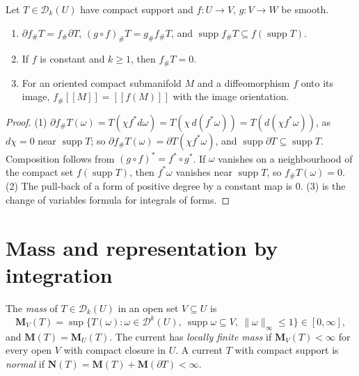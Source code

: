 \begin{proposition}\label{currents:proposition-push-forward}
Let $T \in \mathcal{D}_k(U)$ have compact support and $f \colon U \to V$, $g \colon V \to W$ be smooth.
\begin{enumerate}
\item $\partial f_\#T = f_\#\partial T$, $(g \circ f)_\#T = g_\#f_\#T$, and $\operatorname{supp}f_\#T \subseteq f(\operatorname{supp}T)$.
\item If $f$ is constant and $k \geq 1$, then $f_\#T = 0$.
\item For an oriented compact submanifold $M$ and a diffeomorphism $f$ onto its image, $f_\#[\![M]\!] = [\![f(M)]\!]$ with the image orientation.
\end{enumerate}
\end{proposition}

\begin{proof}
(1) $\partial f_\#T(\omega) = T(\chi f^*d\omega) = T(\chi\,d(f^*\omega)) = T(d(\chi f^*\omega))$, as $d\chi = 0$ near $\operatorname{supp}T$; so $\partial f_\#T(\omega) = \partial T(\chi f^*\omega)$, and
$\operatorname{supp}\partial T \subseteq \operatorname{supp}T$. Composition follows from $(g \circ f)^* = f^* \circ g^*$. If $\omega$ vanishes on a neighbourhood of the compact set $f(\operatorname{supp}T)$, then
$f^*\omega$ vanishes near $\operatorname{supp}T$, so $f_\#T(\omega) = 0$. (2) The pull-back of a form of positive degree by a constant map is $0$. (3) is the change of variables formula for integrals of forms.
\end{proof}

\section{Mass and representation by integration}\label{currents:section-mass}

\begin{definition}\label{currents:definition-mass}
The \emph{mass} of $T \in \mathcal{D}_k(U)$ in an open set $V \subseteq U$ is
\[
\mathbf{M}_V(T) = \sup\{T(\omega) : \omega \in \mathcal{D}^k(U),\ \operatorname{supp}\omega \subseteq V,\ \|\omega\|_\infty \leq 1\} \in [0, \infty],
\]
and $\mathbf{M}(T) = \mathbf{M}_U(T)$. The current has \emph{locally finite mass} if $\mathbf{M}_V(T) < \infty$ for every open $V$ with compact closure in $U$. A current $T$ with compact support is \emph{normal} if
$\mathbf{N}(T) = \mathbf{M}(T) + \mathbf{M}(\partial T) < \infty$.
\end{definition}

